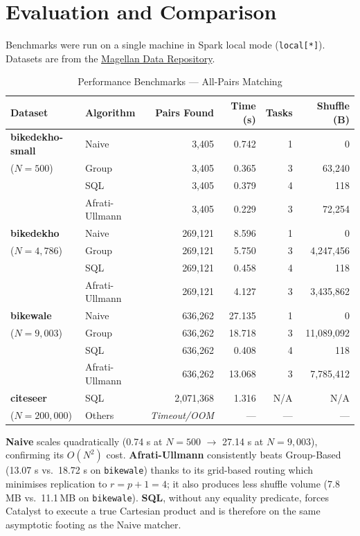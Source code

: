 \documentclass[11pt,a4paper]{article}
\begin{document}
\section*{Evaluation and Comparison}
Benchmarks were run on a single machine in Spark local mode (\texttt{local[*]}). Datasets are from the \href{https://sites.google.com/site/anhaidgroup/useful-stuff/the-magellan-data-repository}{Magellan Data Repository}.

\begin{table}[htbp]
\centering
\caption{Performance Benchmarks — All-Pairs Matching}
\label{tab:results}
\begin{tabular}{llrrrr}
\toprule
\textbf{Dataset} & \textbf{Algorithm} & \textbf{Pairs Found} & \textbf{Time (s)} & \textbf{Tasks} & \textbf{Shuffle (B)} \\
\midrule
\textbf{bikedekho-small}
 & Naive          & 3,405   & 0.742  & 1 & 0          \\
 ($N=500$)
 & Group          & 3,405   & 0.365  & 3 & 63,240     \\
 & SQL            & 3,405   & 0.379  & 4 & 118        \\
 & Afrati-Ullmann & 3,405   & 0.229  & 3 & 72,254     \\
\midrule
\textbf{bikedekho}
 & Naive          & 269,121 & 8.596  & 1 & 0          \\
 ($N=4{,}786$)
 & Group          & 269,121 & 5.750  & 3 & 4,247,456  \\
 & SQL            & 269,121 & 0.458  & 4 & 118        \\
 & Afrati-Ullmann & 269,121 & 4.127  & 3 & 3,435,862  \\
\midrule
\textbf{bikewale}
 & Naive          & 636,262 & 27.135 & 1 & 0          \\
 ($N=9{,}003$)
 & Group          & 636,262 & 18.718 & 3 & 11,089,092 \\
 & SQL            & 636,262 & 0.408  & 4 & 118        \\
 & Afrati-Ullmann & 636,262 & 13.068 & 3 & 7,785,412  \\
\midrule
\textbf{citeseer}
 & SQL    & 2,071,368           & 1.316 & N/A & N/A \\
 ($N=200{,}000$)
 & Others & \textit{Timeout/OOM} & ---   & --- & ---  \\
\bottomrule
\end{tabular}
\end{table}

\noindent\textbf{Naive} scales quadratically (0.74 s at $N=500$ $\to$ 27.14 s at $N=9{,}003$), confirming its $O(N^2)$ cost. \textbf{Afrati-Ullmann} consistently beats Group-Based (13.07 s vs.\ 18.72 s on \texttt{bikewale}) thanks to its grid-based routing which minimises replication to $r = p+1 = 4$; it also produces less shuffle volume (7.8\,MB vs.\ 11.1\,MB on \texttt{bikewale}). \textbf{SQL}, without any equality predicate, forces Catalyst to execute a true Cartesian product and is therefore on the same asymptotic footing as the Naive matcher.
\end{document}
